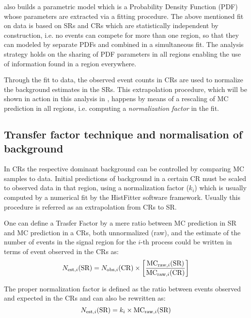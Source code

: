 \hf also builds a parametric model which is a Probability Density Function (PDF) whose parameters are extracted via a fitting procedure. The above mentioned fit on data is based on SRs and CRs which are statistically independent by construction, i.e. no events can compete for more than one region, so that they can modeled by separate PDFs and combined in a simultaneous fit. The \hf analysis strategy holds on the sharing of PDF parameters in all regions enabling the use of information found in a region everywhere.

Through the fit to data, the observed event counts in CRs are used to normalize the background estimates in the SRs. This extrapolation procedure, which will be shown in action in this analysis in \Fig{\ref{fig:regions}}, happens by means of a rescaling of MC prediction in all regions, i.e. computing a \emph{normalization factor} in the fit.


\subsection{Transfer factor technique and normalisation of background}
In CRs the respective dominant background can be controlled by comparing MC samples to data. Initial predictions of background in a certain CR must be scaled to observed data in that region, using a normalization factor ($k_{i}$) which is usually computed by a numerical fit by the HistFitter software framework. Usually this procedure is referred as an extrapolation from CRs to SR.

One can define a Trasfer Factor by a mere ratio between MC prediction in SR and MC prediction in a CRs, both unnormalized (raw), and the estimate of the number of events in the signal region for the $i$-th process could be written in terms of event observed in the CRs as:
\begin{equation}
  \label{eqn:TF}
  N_{\textup{est},i}(\text{SR}) =  N_{\textup{obs},i}({\text{CR}}) \times \left[\frac{\text{MC}_{\textup{raw},i}(\text{SR})}{\text{MC}_{\textup{raw},i}(\text{CR})} \right]
\end{equation}

The proper normalization factor is defined as the ratio between events observed and expected in the CRs and \Eqn{\ref{eqn:TF}} can also be rewritten as:
\begin{equation}
  N_{\textup{est},i}(\text{SR}) = k_{i}\times\text{MC}_{\textup{raw},i}(\text{SR})
\end{equation}

